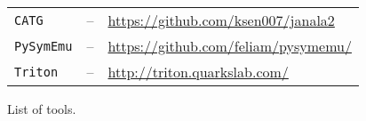 \begin{figure}[t]
\begin{adjustbox}{width=1\columnwidth}
\begin{tabular}{| l || c || l |}
    {\tt CATG} & -- & \url{https://github.com/ksen007/janala2} \\
    {\tt PySymEmu} & -- & \url{https://github.com/feliam/pysymemu/} \\
    {\tt Triton} & -- & \url{http://triton.quarkslab.com/} \\
    \hline  
  \end{tabular}
  \end{adjustbox}
  \caption{List of tools.}
  \label{tab:symbolic-engines}
\end{figure}

